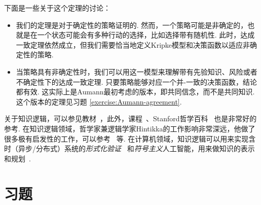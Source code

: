 下面是一些关于这个定理的讨论：
\begin{itemize}
    \item 我们的定理是对于确定性的策略证明的. 然而，一个策略可能是非确定的，也就是在一个状态可能会有多种行动的选择，比如选择带有随机性. 此时，达成一致定理依然成立，但我们需要恰当地定义Kripke模型和决策函数以适应非确定性的策略. 
    \item 当策略具有非确定性时，我们可以用这一模型来理解带有先验知识、风险或者不确定性下的达成一致定理. 只要策略能够对应一个并-一致的决策函数，结论都有效. 这实际上是Aumann最初考虑的版本，即共同信念，而不是共同知识. 这个版本的定理见习题 \ref{exercise:Aumann-agreement}.
\end{itemize}

\begin{remark}
    关于知识逻辑，可以参见教材~\cite{faginReasoningKnowledge2003}，此外，课程~\cite{WangYanJingEpistemicLogic,WangYanJingKnowingThat}、Stanford哲学百科~\cite{rendsvigEpistemicLogic2024} 也是非常好的参考. 在知识逻辑领域，哲学家兼逻辑学家Hintikka的工作影响非常深远，他做了很多极有启发性的工作，可以参考~\cite{hintikkaREASONINGKNOWLEDGEPHILOSOPHY1986,hendricksHintikkaEpistemologicalAxiomatizations2004,sanduShortOverviewDevelopment2018} 等. 在计算机领域，知识逻辑可以用来实现含时（异步/分布式）系统的\textit{形式化验证}~\cite{lamportTLAHomePage,queilleSpecificationVerificationConcurrent1982,emersonCharacterizingCorrectnessProperties1980,clarkeDesignSynthesisSynchronization1981} 和\textit{符号主义}人工智能，用来做知识的表示和规划~\cite{halpernKnowledgeCommonKnowledge1990,liDynamicEpistemicFramework2019,liMoreFreeDynamic2017,liPlanningbasedKnowingHow2021}.
\end{remark}

\section{习题}

